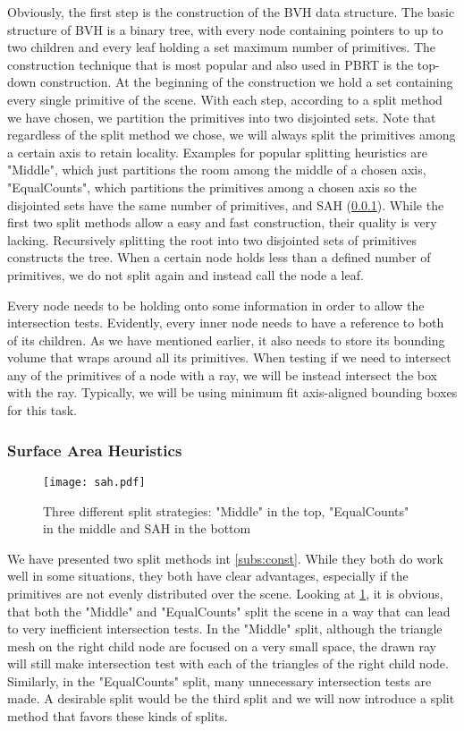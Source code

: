 Obviously, the first step is the construction of the BVH data structure. The basic structure of BVH is a binary tree, with every node containing pointers to up to two children and every leaf holding a set maximum number of primitives. The construction technique that is most popular and also used in PBRT is the top-down construction. At the beginning of the construction we hold a set containing every single primitive of the scene. With each step, according to a split method we have chosen, we partition the primitives into two disjointed sets. Note that regardless of the split method we chose, we will always split the primitives among a certain axis to retain locality. Examples for popular splitting heuristics are "Middle", which just partitions the room among the middle of a chosen axis, "EqualCounts", which partitions the primitives among a chosen axis so the disjointed sets have the same number of primitives, and SAH (\ref{pre:sah}). While the first two split methods allow a easy and fast construction, their quality is very lacking. Recursively splitting the root into two disjointed sets of primitives constructs the tree. When a certain node holds less than a defined number of primitives, we do not split again and instead call the node a leaf.

Every node needs to be holding onto some information in order to allow the intersection tests. Evidently, every inner node needs to have a reference to both of its children. As we have mentioned earlier, it also needs to store its bounding volume that wraps around all its primitives. When testing if we need to intersect any of the primitives of a node with a ray, we will be instead intersect the box with the ray. Typically, we will be using minimum fit axis-aligned bounding boxes for this task.

\subsubsection{Surface Area Heuristics}
\label{pre:sah}

\begin{figure}
	\begin{center}
		\texttt{[image: sah.pdf]}
		\caption{Three different split strategies: "Middle" in the top, "EqualCounts" in the middle and SAH in the bottom}
		\label{fig:sah}
	\end{center}
\end{figure}


We have presented two split methods int \ref{subs:const}. While they both do work well in some situations, they both have clear advantages, especially if the primitives are not evenly distributed over the scene. Looking at \ref{fig:sah}, it is obvious, that both the "Middle" and "EqualCounts" split the scene in a way that can lead to very inefficient intersection tests. In the "Middle" split, although the triangle mesh on the right child node are focused on a very small space, the drawn ray will still make intersection test with each of the triangles of the right child node. Similarly, in the "EqualCounts" split, many unnecessary intersection tests are made. A desirable split would be the third split and we will now introduce a split method that favors these kinds of splits.

